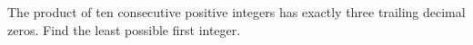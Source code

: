 The product of ten consecutive positive integers has exactly three trailing decimal zeros. Find the least possible first integer.
